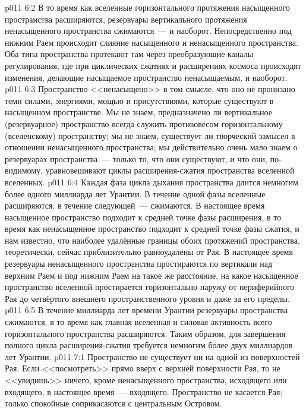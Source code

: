 \vs p011 6:2 В то время как вселенные горизонтального протяжения насыщенного пространства расширяются, резервуары вертикального протяжения ненасыщенного пространства сжимаются~--- и наоборот. Непосредственно под нижним Раем происходит слияние насыщенного и ненасыщенного пространства. Оба типа пространства протекают там через преобразующие каналы регулирования, где при циклических сжатиях и расширениях космоса происходят изменения, делающие насыщаемое пространство ненасыщаемым, и наоборот.
\vs p011 6:3 \pc Пространство <<ненасыщено>> в том смысле, что оно не пронизано теми силами, энергиями, мощью и присутствиями, которые существуют в насыщенном пространстве. Мы не знаем, предназначено ли вертикальное (резервуарное) пространство всегда служить противовесом горизонтальному (вселенскому) пространству; мы не знаем, существует ли творческий замысел в отношении ненасыщенного пространства; мы действительно очень мало знаем о резервуарах пространства~--- только то, что они существуют, и что они, по\hyp{}видимому, уравновешивают циклы расширения\hyp{}сжатия пространства вселенной вселенных.
\vs p011 6:4 \pc Каждая фаза цикла дыхания пространства длится немногим более одного миллиарда лет Урантии. В течение одной фазы вселенные расширяются, в течение следующей~--- сжимаются. В настоящее время насыщенное пространство подходит к средней точке фазы расширения, в то время как ненасыщенное пространство подходит к средней точке фазы сжатия, и нам известно, что наиболее удалённые границы обоих протяжений пространства, теоретически, сейчас приблизительно равноудалены от Рая. В настоящее время резервуары ненасыщенного пространства простираются по вертикали над верхним Раем и под нижним Раем на такое же расстояние, на какое насыщенное пространство вселенной простирается горизонтально наружу от периферийного Рая до четвёртого внешнего пространственного уровня и даже за его пределы.
\vs p011 6:5 В течение миллиарда лет времени Урантии резервуары пространства сжимаются, в то время как главная вселенная и силовая активность всего горизонтального пространства расширяются. Таким образом, для завершения полного цикла расширения\hyp{}сжатия требуется немногим более двух миллиардов лет Урантии.
\vs p011 7:1 Пространство не существует ни на одной из поверхностей Рая. Если <<посмотреть>> прямо вверх с верхней поверхности Рая, то не <<увидишь>> ничего, кроме ненасыщенного пространства, исходящего или входящего, в настоящее время~--- входящего. Пространство не касается Рая; только спокойные  соприкасаются с центральным Островом.
